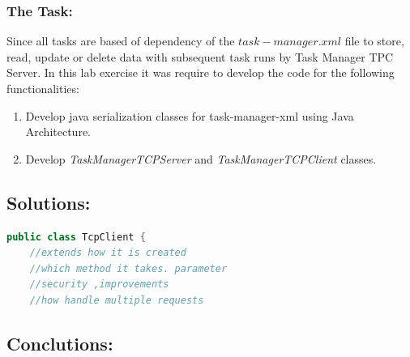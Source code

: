 \subsubsection*{The Task:}
Since all tasks are based of dependency of the $task-manager.xml$ file to store, read, update or delete data with subsequent task runs by Task Manager TPC Server. In this lab exercise it was require to develop the code for the following functionalities:

\begin{enumerate}
\item Develop java serialization classes for task-manager-xml using Java Architecture.
\item Develop \textit{TaskManagerTCPServer} and \textit{TaskManagerTCPClient} classes.
\end{enumerate}

%

\subsection*{Solutions:}

\begin{lstlisting}[language=java]
	public class TcpClient {
	//extends how it is created
	//which method it takes. parameter
	//security ,improvements
	//how handle multiple requests
\end{lstlisting}

\subsection*{Conclutions:}